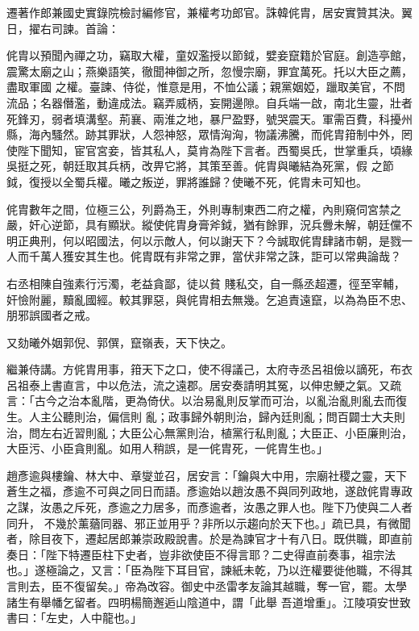 \begin{pinyinscope}
 遷著作郎兼國史實錄院檢討編修官，兼權考功郎官。誅韓侂胄，居安實贊其決。翼日，擢右司諫。首論：



 侂胄以預聞內禪之功，竊取大權，童奴濫授以節鉞，嬖妾竄籍於官庭。創造亭館，震驚太廟之山；燕樂語笑，徹聞神御之所，忽慢宗廟，罪宜萬死。托以大臣之薦，盡取軍國
 之權。臺諫、侍從，惟意是用，不恤公議；親黨姻婭，躐取美官，不問流品；名器僭濫，動違成法。竊弄威柄，妄開邊隙。自兵端一啟，南北生靈，壯者死鋒刃，弱者填溝壑。荊襄、兩淮之地，暴尸盈野，號哭震天。軍需百費，科擾州縣，海內騷然。跡其罪狀，人怨神怒，眾情洶洶，物議沸騰，而侂胄箝制中外，罔使陛下聞知，宦官宮妾，皆其私人，莫肯為陛下言者。西蜀吳氏，世掌重兵，頃緣吳挺之死，朝廷取其兵柄，改畀它將，其策至善。侂胄與曦結為死黨，假
 之節鉞，復授以全蜀兵權。曦之叛逆，罪將誰歸？使曦不死，侂胄未可知也。



 侂胄數年之間，位極三公，列爵為王，外則專制東西二府之權，內則窺伺宮禁之嚴，奸心逆節，具有顯狀。縱使侂胄身膏斧鉞，猶有餘罪，況兵釁未解，朝廷儻不明正典刑，何以昭國法，何以示敵人，何以謝天下？今誠取侂胄肆諸市朝，是戮一人而千萬人獲安其生也。侂胄既有非常之罪，當伏非常之誅，詎可以常典論哉？



 右丞相陳自強素行污濁，老益貪鄙，徒以貧
 賤私交，自一縣丞超遷，徑至宰輔，奸憸附麗，黷亂國經。較其罪惡，與侂胄相去無幾。乞追責遠竄，以為為臣不忠、朋邪誤國者之戒。



 又劾曦外姻郭倪、郭僎，竄嶺表，天下快之。



 繼兼侍講。方侂胄用事，箝天下之口，使不得議己，太府寺丞呂祖儉以謫死，布衣呂祖泰上書直言，中以危法，流之遠郡。居安奏請明其冤，以伸忠鯁之氣。又疏言：「古今之治本亂階，更為倚伏。以治易亂則反掌而可治，以亂治亂則亂去而復生。人主公聽則治，偏信則
 亂；政事歸外朝則治，歸內廷則亂；問百闢士大夫則治，問左右近習則亂；大臣公心無黨則治，植黨行私則亂；大臣正、小臣廉則治，大臣污、小臣貪則亂。如用人稍誤，是一侂胄死，一侂胄生也。」



 趙彥逾與樓鑰、林大中、章燮並召，居安言：「鑰與大中用，宗廟社稷之靈，天下蒼生之福，彥逾不可與之同日而語。彥逾始以趙汝愚不與同列政地，遂啟侂胄專政之謀，汝愚之斥死，彥逾之力居多，而彥逾者，汝愚之罪人也。陛下乃使與二人者同升，
 不幾於薰蕕同器、邪正並用乎？非所以示趨向於天下也。」疏已具，有微聞者，除目夜下，遷起居郎兼崇政殿說書。於是為諫官才十有八日。既供職，即直前奏日：「陛下特遷臣柱下史者，豈非欲使臣不得言耶？二史得直前奏事，祖宗法也。」遂極論之，又言：「臣為陛下耳目官，諫紙未乾，乃以迕權要徙他職，不得其言則去，臣不復留矣。」帝為改容。御史中丞雷孝友論其越職，奪一官，罷。太學諸生有舉幡乞留者。四明楊簡邂逅山陰道中，謂「此舉
 吾道增重」。江陵項安世致書曰：「左史，人中龍也。」




\end{pinyinscope}

